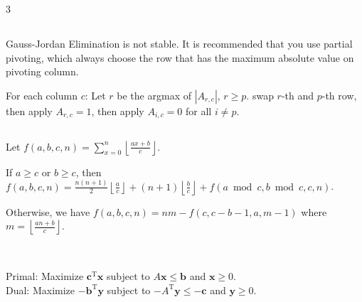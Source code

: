 \documentclass[landscape, 8pt, a4paper, oneside]{extarticle}
\begin{document}
\begin{multicols*}{3}
\subsection{}
Gauss-Jordan Elimination is not stable. It is recommended that you use partial pivoting, which always choose the row that has the maximum absolute value on pivoting column.

For each column $c$: Let $r$ be the argmax of $|A_{r, c}|$, $r \ge p$. swap $r$-th and $p$-th row, then apply $A_{r, c} = 1$, then apply $A_{i, c} = 0$ for all $i \neq p$.
\subsection{}
Let $f(a, b, c, n) = \sum_{x=0}^{n} \left\lfloor \frac{ax+b}{c} \right\rfloor$.

If $a \ge c$ or $b \ge c$, then $f(a, b, c, n) = \frac{n(n+1)}{2} \left\lfloor \frac{a}{c} \right\rfloor + (n+1) \left\lfloor \frac{b}{c} \right\rfloor + f(a \bmod c, b \bmod c, c, n)$.

Otherwise, we have $f(a, b, c, n) = nm - f(c, c-b-1, a, m-1)$ where $m = \left\lfloor \frac{an+b}{c} \right\rfloor$.
\subsection{}
 \\
Primal: Maximize $\mathbf{c}^\mathrm{T} \mathbf{x}$ subject to $A \mathbf{x} \le \mathbf{b}$ and $\mathbf{x} \ge 0$. \\
Dual: Maximize $-\mathbf{b}^\mathrm{T} \mathbf{y}$ subject to $-A^\mathrm{T} \mathbf{y} \le -\mathbf{c}$ and $\mathbf{y} \ge 0$.


\end{multicols*}
\end{document}
